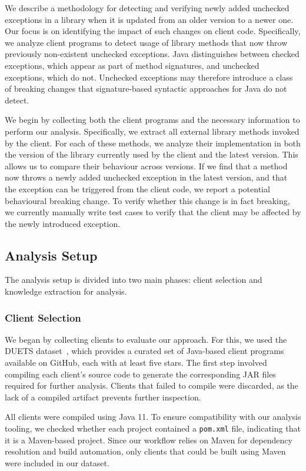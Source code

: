 We describe a methodology for detecting and verifying newly added unchecked exceptions in a library when it is updated from an older version to a newer one. Our focus is on identifying the impact of such changes on client code. Specifically, we analyze client programs to detect usage of library methods that now throw previously non-existent unchecked exceptions. Java distinguishes between checked exceptions, which appear as part of method signatures, and unchecked exceptions, which do not. Unchecked exceptions may therefore introduce a class of breaking changes that signature-based syntactic approaches for Java do not detect.

We begin by collecting both the client programs and the necessary information to perform our analysis. Specifically, we extract all external library methods invoked by the client. For each of these methods, we analyze their implementation in both the version of the library currently used by the client and the latest version. This allows us to compare their behaviour across versions. If we find that a method now throws a newly added unchecked exception in the latest version, and that the exception can be triggered from the client code, we report a potential behavioural breaking change. To verify whether this change is in fact breaking, we currently manually write test cases to verify that the client may be affected by the newly introduced exception.

\subsection{Analysis Setup}

The analysis setup is divided into two main phases: client selection and knowledge extraction for analysis.

\subsubsection{Client Selection}

We began by collecting clients to evaluate our approach. For this, we used the DUETS dataset~\cite{durieux21:_duets}, which provides a curated set of Java-based client programs available on GitHub, each with at least five stars. The first step involved compiling each client's source code to generate the corresponding JAR files required for further analysis. Clients that failed to compile were discarded, as the lack of a compiled artifact prevents further inspection.

All clients were compiled using Java 11. To ensure compatibility with our analysis tooling, we checked whether each project contained a \texttt{pom.xml} file, indicating that it is a Maven-based project. Since our workflow relies on Maven for dependency resolution and build automation, only clients that could be built using Maven were included in our dataset.

